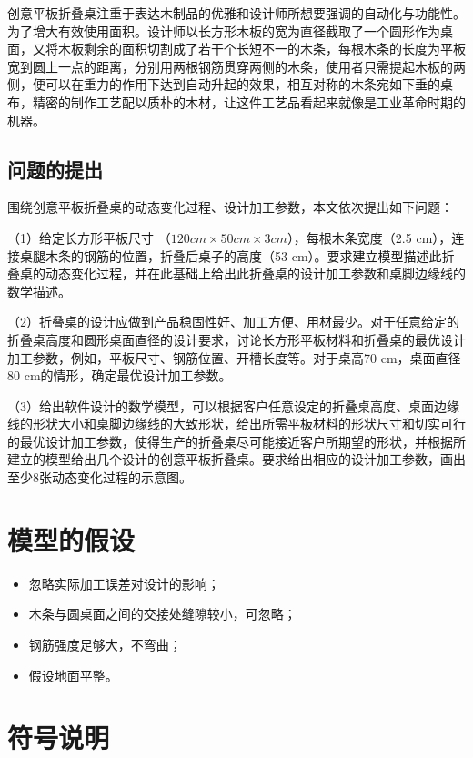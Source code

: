 \documentclass[withoutpreface,bwprint]{cumcmthesis}
\begin{document}
创意平板折叠桌注重于表达木制品的优雅和设计师所想要强调的自动化与功能性。为了增大有效使用面积。设计师以长方形木板的宽为直径截取了一个圆形作为桌面，又将木板剩余的面积切割成了若干个长短不一的木条，每根木条的长度为平板宽到圆上一点的距离，分别用两根钢筋贯穿两侧的木条，使用者只需提起木板的两侧，便可以在重力的作用下达到自动升起的效果，相互对称的木条宛如下垂的桌布，精密的制作工艺配以质朴的木材，让这件工艺品看起来就像是工业革命时期的机器。

\subsection{问题的提出}

围绕创意平板折叠桌的动态变化过程、设计加工参数，本文依次提出如下问题：

（1）给定长方形平板尺寸 （$120 cm \times 50 cm \times 3 cm$），每根木条宽度（2.5 cm），连接桌腿木条的钢筋的位置，折叠后桌子的高度（53 cm）。要求建立模型描述此折叠桌的动态变化过程，并在此基础上给出此折叠桌的设计加工参数和桌脚边缘线的数学描述。



（2）折叠桌的设计应做到产品稳固性好、加工方便、用材最少。对于任意给定的折叠桌高度和圆形桌面直径的设计要求，讨论长方形平板材料和折叠桌的最优设计加工参数，例如，平板尺寸、钢筋位置、开槽长度等。对于桌高70 cm，桌面直径80 cm的情形，确定最优设计加工参数。


（3）给出软件设计的数学模型，可以根据客户任意设定的折叠桌高度、桌面边缘线的形状大小和桌脚边缘线的大致形状，给出所需平板材料的形状尺寸和切实可行的最优设计加工参数，使得生产的折叠桌尽可能接近客户所期望的形状，并根据所建立的模型给出几个设计的创意平板折叠桌。要求给出相应的设计加工参数，画出至少8张动态变化过程的示意图。

\section{模型的假设}

\begin{itemize}
\item 忽略实际加工误差对设计的影响；
\item 木条与圆桌面之间的交接处缝隙较小，可忽略；
\item 钢筋强度足够大，不弯曲；
\item 假设地面平整。
\end{itemize}

\section{符号说明}
\end{document}
